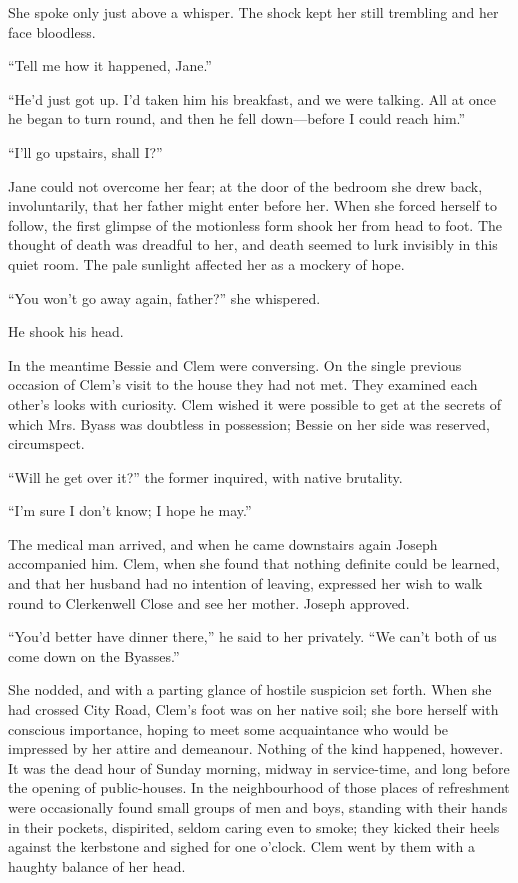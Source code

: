 She spoke only just above a whisper. The shock kept her still trembling
and her face bloodless.

``Tell me how it happened, Jane.''

``He'd just got up. I'd taken him his breakfast, and we were talking.
All at once he began to turn round, and then he fell down---before I
could reach him.''

``I'll go upstairs, shall I?''

Jane could not overcome her fear; at the door of the bedroom she drew
back, involuntarily, that her father might enter before her. When she
forced herself to follow, the first
{\protect\hypertarget{163}{}{}}glimpse of the motionless form shook her
from head to foot. The thought of death was dreadful to her, and death
seemed to lurk invisibly in this quiet room. The pale sunlight affected
her as a mockery of hope.

``You won't go away again, father?'' she whispered.

He shook his head.

In the meantime Bessie and Clem were conversing. On the single previous
occasion of Clem's visit to the house they had not met. They examined
each other's looks with curiosity. Clem wished it were possible to get
at the secrets of which Mrs. Byass was doubtless in possession; Bessie
on her side was reserved, circumspect.

``Will he get over it?'' the former inquired, with native brutality.

``I'm sure I don't know; I hope he may.''

The medical man arrived, and when he came downstairs again Joseph
accompanied him. Clem, when she found that nothing definite could be
learned, and that her husband had no intention of leaving, expressed her
wish to walk round to Clerkenwell Close and see her mother. Joseph
approved.

{\protect\hypertarget{164}{}{}}``You'd better have dinner there,'' he
said to her privately. ``We can't both of us come down on the Byasses.''

She nodded, and with a parting glance of hostile suspicion set forth.
When she had crossed City Road, Clem's foot was on her native soil; she
bore herself with conscious importance, hoping to meet some acquaintance
who would be impressed by her attire and demeanour. Nothing of the kind
happened, however. It was the dead hour of Sunday morning, midway in
service-time, and long before the opening of public-houses. In the
neighbourhood of those places of refreshment were occasionally found
small groups of men and boys, standing with their hands in their
pockets, dispirited, seldom caring even to smoke; they kicked their
heels against the kerbstone and sighed for one o'clock. Clem went by
them with a haughty balance of her head.

